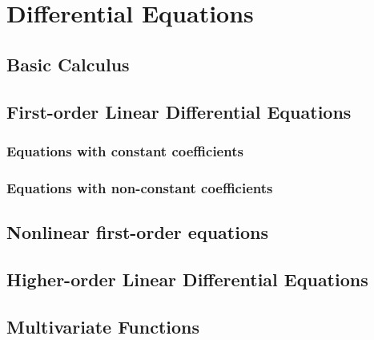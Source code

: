 \documentclass[main.tex]{subfiles}
\begin{document}
	\chapter{Differential Equations}
		\section{Basic Calculus}
		
		\section[1st-order LDEs]{First-order Linear Differential Equations}
			\subsection{Equations with constant coefficients}
				
			\subsection{Equations with non-constant coefficients}
			
		\section{Nonlinear first-order equations}
		
		\section[Higher-order LDEs]{Higher-order Linear Differential Equations}
		
		\section{Multivariate Functions}
	
\end{document}
